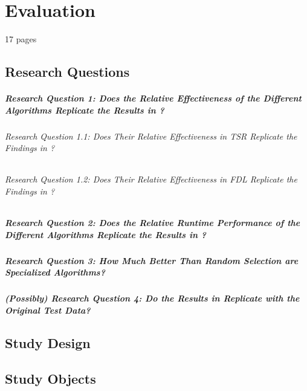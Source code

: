 
\chapter{Evaluation}\label{chapter:evaluation}

17 pages

\section{Research Questions}

\paragraph{Research Question 1: Does the Relative Effectiveness of the Different Algorithms Replicate the Results in \cite{cruciani2019scalable}?}

\subparagraph{Research Question 1.1: Does Their Relative Effectiveness in TSR Replicate the Findings
in \cite{cruciani2019scalable}?}

\subparagraph{Research Question 1.2: Does Their Relative Effectiveness in FDL Replicate the Findings in \cite{cruciani2019scalable}?}

\paragraph{Research Question 2: Does the Relative Runtime Performance of the Different Algorithms Replicate the Results in \cite{cruciani2019scalable}?}

\paragraph{Research Question 3: How Much Better Than Random Selection are Specialized Algorithms?}

\paragraph{(Possibly) Research Question 4: Do the Results in \cite{cruciani2019scalable} Replicate with the Original Test Data?}

\section{Study Design}

\section{Study Objects}

